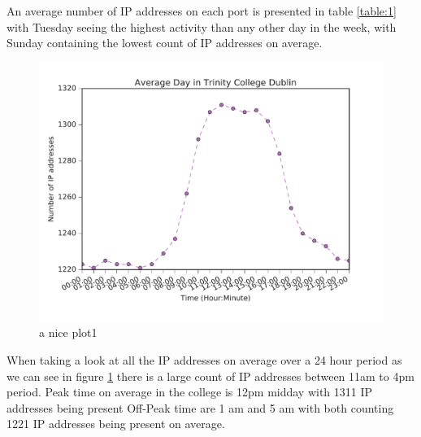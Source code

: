 \documentclass[a4wide,leqno,12pt]{report}
\begin{document}
An average number of IP addresses on each port is presented in table \ref{table:1} with Tuesday seeing the highest activity than any other day in the week, with Sunday containing the lowest count of IP addresses on average.

\begin{figure}[H]
\centering
\includegraphics[scale=.5]{pdf_images/AverageDayinTrinityCollegeDublin}
\caption{a nice plot1}
\label{fig:average_day}
\end{figure}
When taking a look at all the IP addresses on average over a 24 hour period as we can see in figure \ref{fig:average_day} there is a large count of IP addresses between 11am to 4pm period. Peak time on average in the college is 12pm midday with 1311 IP addresses being present
Off-Peak time are 1 am and 5 am with both counting 1221 IP addresses being present on average.
 
\end{document}
